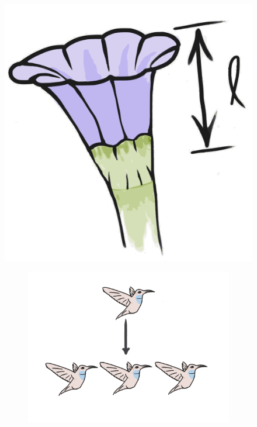 \begin{figure}

  \centering
\begin{minipage}[]{0.1\textwidth}
\includegraphics[width=\textwidth]{img/hbird_flower}
\end{minipage}%
\begin{minipage}[]{0.45\textwidth}
   \begin{subfigure}[b]{\textwidth}
    \centering
  \includegraphics[width=\textwidth]{img/hbird_lowevol}

\end{subfigure}
\end{minipage}
\end{figure}
